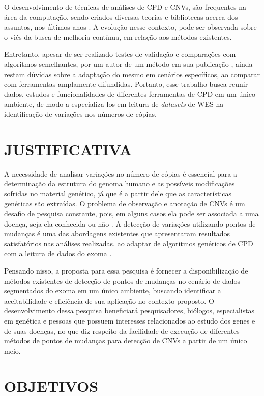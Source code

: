 O desenvolvimento de técnicas de análises de CPD e CNVs, são frequentes na área da computação, sendo criados diversas teorias e bibliotecas acerca dos assuntos, nos últimos anos \cite{Girimurugan2018,Uzai2019,Chu2019}. A evolução nesse contexto, pode ser observada sobre o viés da busca de melhoria contínua, em relação aos métodos existentes.

Entretanto, apesar de ser realizado testes de validação e comparações com algoritmos semelhantes, por um autor de um método em sua publicação \cite{Uzai2019,Baldi2001}, ainda restam dúvidas sobre a adaptação do mesmo em cenários específicos, ao comparar com ferramentas amplamente difundidas. Portanto, esse trabalho busca reunir dados, estudos e funcionalidades de diferentes ferramentas de CPD em um único ambiente, de modo a especializa-los em leitura de \textit{datasets} de WES na identificação de variações nos números de cópias.

\section{JUSTIFICATIVA}

A necessidade de analisar variações no número de cópias é essencial para a determinação da estrutura do genoma humano e as possíveis modificações sofridas no material genético, já que é a partir dele que as características genéticas são extraídas. O problema de observação e anotação de CNVs é um desafio de pesquisa constante, pois, em alguns casos ela pode ser associada a uma doença, seja ela conhecida ou não \cite{McCarroll2007}. A detecção de variações utilizando pontos de mudanças é uma das abordagens existentes que apresentaram resultados satisfatórios nas análises realizadas, ao adaptar de algoritmos genéricos de CPD com a leitura de dados do exoma \cite{Olshen2004,Picard2011,Girimurugan2018}.

Pensando nisso, a proposta para essa pesquisa é fornecer a disponibilização de métodos existentes de detecção de pontos de mudanças no cenário de dados segmentados do exoma em um único ambiente, buscando identificar a aceitabilidade e eficiência de sua aplicação no contexto proposto. O desenvolvimento dessa pesquisa beneficiará pesquisadores, biólogos, especialistas em genética e pessoas que possuem interesses relacionados ao estudo dos genes e de suas doenças, no que diz respeito da facilidade de execução de diferentes métodos de pontos de mudanças para detecção de CNVs a partir de um único meio.

\section{OBJETIVOS}

